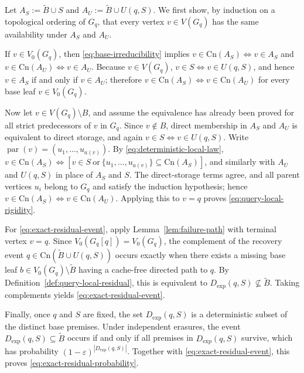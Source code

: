 \documentclass[journal]{IEEEtran}
\makeatletter
\newcommand{\Cn}{\text{Cn}}
\numberwithin{equation}{section}
\renewenvironment{proof}[1][\proofname]{\par
  \pushQED{\qed}%
  \normalfont \topsep6\p@\@plus6\p@\relax
  \trivlist
  \item[\hskip\labelsep
        \itshape
    #1\@addpunct{.}]\ignorespaces
}{%
  \popQED\endtrivlist\@endpefalse
}
\makeatother
\begin{document}
\begin{proof}
Let \(A_S:=\widetilde B\cup S\) and \(A_U:=\widetilde B\cup U(q,S)\).
We first show, by induction on a topological ordering of \(G_q\), that every
vertex \(v\in V(G_q)\) has the same availability under \(A_S\) and \(A_U\).

If \(v\in V_0(G_q)\), then \eqref{eq:base-irreducibility} implies
\(v\in\Cn(A_S)\Leftrightarrow v\in A_S\) and
\(v\in\Cn(A_U)\Leftrightarrow v\in A_U\).  Because \(v\in V(G_q)\),
\(v\in S\Leftrightarrow v\in U(q,S)\), and hence \(v\in A_S\) if and only if
\(v\in A_U\); therefore \(v\in\Cn(A_S)\Leftrightarrow v\in\Cn(A_U)\) for
every base leaf \(v\in V_0(G_q)\).

Now let \(v\in V(G_q)\setminus B\), and assume the equivalence has already been
proved for all strict predecessors of \(v\) in \(G_q\).  Since \(v\notin B\),
direct membership in \(A_S\) and \(A_U\) is equivalent to direct storage, and
again \(v\in S\Leftrightarrow v\in U(q,S)\).  Write
\(\operatorname{par}(v)=(u_1,\ldots,u_{a(v)})\).  By
\eqref{eq:deterministic-local-law},
\(v\in\Cn(A_S)\Leftrightarrow[v\in S\ \text{or}\
\{u_1,\ldots,u_{a(v)}\}\subseteq\Cn(A_S)]\),
and similarly with \(A_U\) and \(U(q,S)\) in place of \(A_S\) and \(S\).
The direct-storage terms agree, and all parent vertices \(u_i\) belong to
\(G_q\) and satisfy the induction hypothesis; hence
\(v\in\Cn(A_S)\Leftrightarrow v\in\Cn(A_U)\).
Applying this to \(v=q\) proves \eqref{eq:query-local-rigidity}.

For \eqref{eq:exact-residual-event}, apply
Lemma~\ref{lem:failure-path} with terminal vertex \(v=q\).  Since
\(V_0(G_q[q])=V_0(G_q)\), the complement of the recovery event
\(q\in\Cn(\widetilde B\cup U(q,S))\)
occurs exactly when there exists a missing base leaf
\(b\in V_0(G_q)\setminus\widetilde B\) having a cache-free directed path to
\(q\).  By Definition~\ref{def:query-local-residual}, this is equivalent to
\(D_{\mathrm{exp}}(q,S)\nsubseteq\widetilde B\).
Taking complements yields \eqref{eq:exact-residual-event}.

Finally, once \(q\) and \(S\) are fixed, the set \(D_{\mathrm{exp}}(q,S)\) is a
deterministic subset of the distinct base premises.  Under independent erasures,
the event \(D_{\mathrm{exp}}(q,S)\subseteq\widetilde B\) occurs if and only if
all premises in \(D_{\mathrm{exp}}(q,S)\) survive, which has probability
\((1-\varepsilon)^{|D_{\mathrm{exp}}(q,S)|}\).
Together with \eqref{eq:exact-residual-event}, this proves
\eqref{eq:exact-residual-probability}.
\end{proof}
\end{document}
